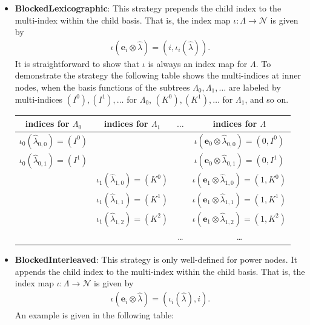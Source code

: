 \documentclass[a4paper,10pt,headings=normal,bibliography=totoc]{scrartcl}
\begin{document}
\begin{itemize}
  \item
    \textbf{BlockedLexicographic}: This strategy prepends the child index
    to the multi-index within the child basis. That is, the index map $\iota:\Lambda \to \mathcal{N}$
    is given by
    \begin{align*}
      \iota(\mathbf{e}_i \otimes \hat{\lambda}) = (i,\iota_i(\hat{\lambda})).
    \end{align*}
    It is straightforward to show that $\iota$ is always an index map
    for $\Lambda$.
    To demonstrate the strategy the following table shows the multi-indices at inner nodes,
    when the basis functions of the subtrees $\Lambda_0, \Lambda_1,\dots$ are labeled by
    multi-indices $(I^0), (I^1), \dots$ for $\Lambda_0$, $(K^0), (K^1), \dots$ for $\Lambda_1$,
    and so on.

    \begin{center}
    \begin{tabular}{c|c|c|c}
      indices for $\Lambda_0$ &
      indices for $\Lambda_1$ &
      \hspace{2em}$\dots$\hspace{2em} &
      indices for $\Lambda$ \\
      \hline
      $\iota_0(\hat{\lambda}_{0,0}) = (I^0)$ & & &
        $\iota(\mathbf{e}_0 \otimes \hat{\lambda}_{0,0}) = (0,I^0)$ \\
      $\iota_0(\hat{\lambda}_{0,1}) = (I^1)$ & & &
        $\iota(\mathbf{e}_0 \otimes \hat{\lambda}_{0,1}) = (0,I^1)$ \\
      & $\iota_1(\hat{\lambda}_{1,0}) = (K^0)$ & &
        $\iota(\mathbf{e}_1 \otimes \hat{\lambda}_{1,0}) = (1,K^0)$ \\
      & $\iota_1(\hat{\lambda}_{1,1}) = (K^1)$ & &
        $\iota(\mathbf{e}_1 \otimes \hat{\lambda}_{1,1}) = (1,K^1)$ \\
      & $\iota_1(\hat{\lambda}_{1,2}) = (K^2)$ & &
        $\iota(\mathbf{e}_1 \otimes \hat{\lambda}_{1,2}) = (1,K^2)$ \\
      & & \dots &
        \dots \\
    \end{tabular}
    \end{center}

  \item
    \textbf{BlockedInterleaved}: This strategy is only well-defined for power nodes. It appends the child index
    to the multi-index within the child basis.
    That is, the index map $\iota:\Lambda \to \mathcal{N}$
    is given by
    \begin{align*}
      \iota(\mathbf{e}_i \otimes\hat{\lambda}) = (\iota_i(\hat{\lambda}),i).
    \end{align*}
    An example is given in the following table:


\end{itemize}
\end{document}
